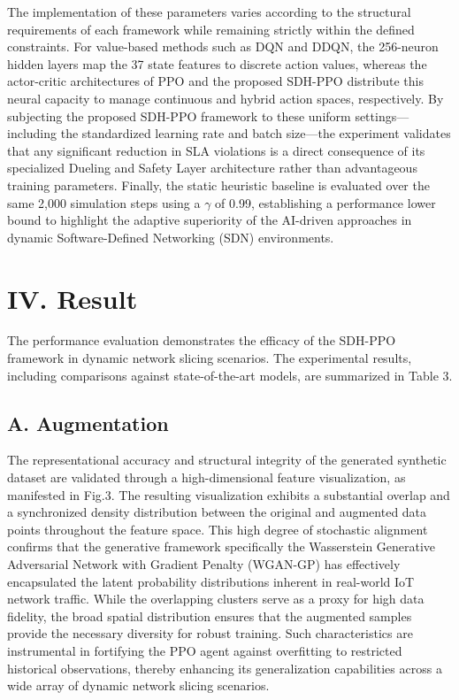 The implementation of these parameters varies according to the structural requirements of each framework while remaining strictly within the defined constraints. For value-based methods such as DQN and DDQN, the 256-neuron hidden layers map the 37 state features to discrete action values, whereas the actor-critic architectures of PPO and the proposed SDH-PPO distribute this neural capacity to manage continuous and hybrid action spaces, respectively. By subjecting the proposed SDH-PPO framework to these uniform settings---including the standardized learning rate and batch size---the experiment validates that any significant reduction in SLA violations is a direct consequence of its specialized Dueling and Safety Layer architecture rather than advantageous training parameters. Finally, the static heuristic baseline is evaluated over the same 2,000 simulation steps using a \(\gamma\) of 0.99, establishing a performance lower bound to highlight the adaptive superiority of the AI-driven approaches in dynamic Software-Defined Networking (SDN) environments.


\section{IV. Result}\label{iv.-result}

The performance evaluation demonstrates the efficacy of the SDH-PPO framework in dynamic network slicing scenarios. The experimental results, including comparisons against state-of-the-art models, are summarized in Table 3.

\subsection{A. Augmentation}\label{a.-augmentation}

The representational accuracy and structural integrity of the generated synthetic dataset are validated through a high-dimensional feature visualization, as manifested in Fig.3. The resulting visualization exhibits a substantial overlap and a synchronized density distribution between the original and augmented data points throughout the feature space. This high degree of stochastic alignment confirms that the generative framework specifically the Wasserstein Generative Adversarial Network with Gradient Penalty (WGAN-GP) has effectively encapsulated the latent probability distributions inherent in real-world IoT network traffic. While the overlapping clusters serve as a proxy for high data fidelity, the broad spatial distribution ensures that the augmented samples provide the necessary diversity for robust training. Such characteristics are instrumental in fortifying the PPO agent against overfitting to restricted historical observations, thereby enhancing its generalization capabilities across a wide array of dynamic network slicing scenarios.

